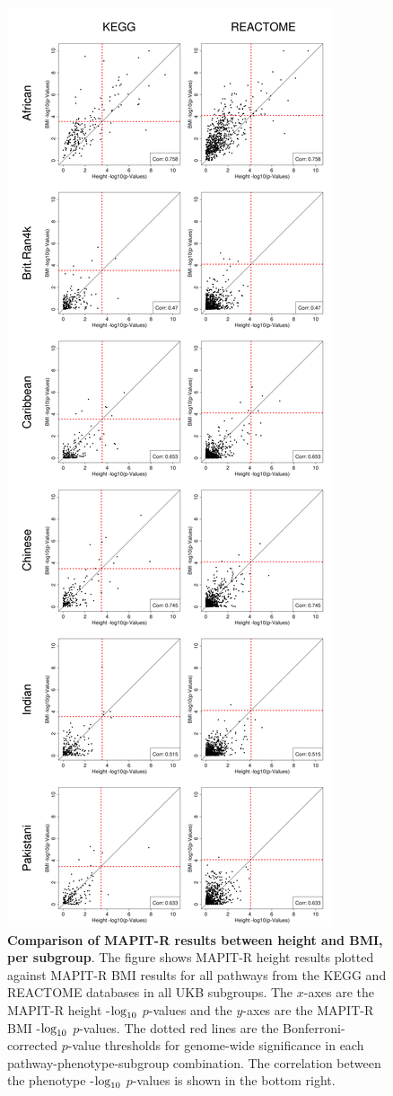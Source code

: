 \documentclass[10pt,a4paper]{article}
\def\log{{\rm log}}
\begin{document}
\setlength{\footskip}{3cm}
\begin{figure}[htbp]
\centering
\vspace*{-2cm}
\includegraphics[scale=.2]{Images/Supp/InterPath_Supp_Figure_MAPITR_PhenoComps_AllPops_vs4.png}
\caption[TBD]{\textbf{Comparison of MAPIT-R results between height and BMI, per subgroup}. The figure shows MAPIT-R height results plotted against MAPIT-R BMI results for all pathways from the KEGG and REACTOME databases in all UKB subgroups. The $x$-axes are the MAPIT-R height -$\log_{10}$ $p$-values and the $y$-axes are the MAPIT-R BMI -$\log_{10}$ $p$-values. The dotted red lines are the Bonferroni-corrected $p$-value thresholds for genome-wide significance in each pathway-phenotype-subgroup combination. The correlation between the phenotype -$\log_{10}$ $p$-values is shown in the bottom right.}
\label{InterPath-Supp-Figure-MAPITR-PhenoComps-AllPops}
\end{figure}
\end{document}
